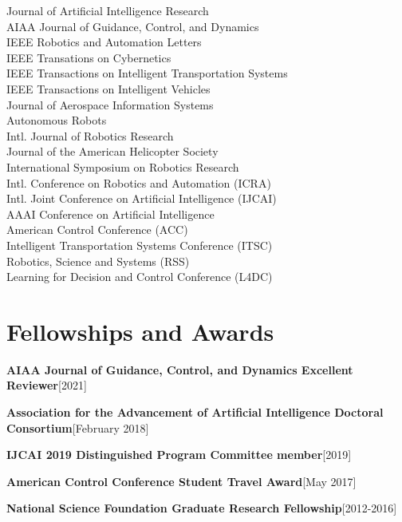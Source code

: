 \documentclass[10pt,roman]{moderncv}
\newcommand{\mycvitem}[2]{
    \textbf{#2}\hfill [#1]\break
}
\begin{document}
\vspace{-2ex}
\begin{multicols}{2}
\small
Journal of Artificial Intelligence Research\\
AIAA Journal of Guidance, Control, and Dynamics\\
IEEE Robotics and Automation Letters\\
IEEE Transations on Cybernetics\\
IEEE Transactions on Intelligent Transportation Systems\\
IEEE Transactions on Intelligent Vehicles\\
Journal of Aerospace Information Systems\\
Autonomous Robots\\
Intl. Journal of Robotics Research\\
Journal of the American Helicopter Society\\
International Symposium on Robotics Research\\
Intl. Conference on Robotics and Automation (ICRA)\\
Intl. Joint Conference on Artificial Intelligence (IJCAI)\\
AAAI Conference on Artificial Intelligence\\
American Control Conference (ACC)\\
Intelligent Transportation Systems Conference (ITSC)\\
Robotics, Science and Systems (RSS)\\
Learning for Decision and Control Conference (L4DC)\\
\end{multicols}

\section{Fellowships and Awards}

\mycvitem{2021}{AIAA Journal of Guidance, Control, and Dynamics Excellent Reviewer}
\mycvitem{February 2018}{Association for the Advancement of Artificial Intelligence Doctoral Consortium}
\mycvitem{2019}{IJCAI 2019 Distinguished Program Committee member}
\mycvitem{May 2017}{American Control Conference Student Travel Award}
\mycvitem{2012-2016}{National Science Foundation Graduate Research Fellowship}
\end{document}
